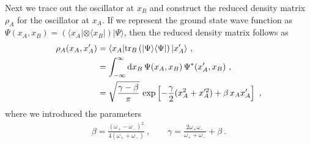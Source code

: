Next we trace out the oscillator at $x_B$ and construct the reduced density matrix $\rho_A$ for the oscillator at $x_A$.
If we represent the ground state wave function as $\Psi (x_A, x_B) = (\langle x_A| \otimes \langle x_B|)| \Psi\rangle$,
then the reduced density matrix follows as
\begin{align}\label{rhoATwoHarm}
\begin{aligned}
\rho_A (x_A, x_A') &=  \langle x_A| {\rm tr}_B \left(|\Psi\rangle \langle \Psi|\right) | x_A'\rangle \ ,\\
&= \int_{-\infty}^\infty \mathrm{d} x_B \, \Psi(x_A, x_B)\,\Psi^\ast (x_A', x_B) \ , \\
&= \sqrt{\frac{\gamma - \beta}{\pi}}\, \exp\left[ -\frac{\gamma}{2}(x_A^2 + x_A'^2) + \beta\, x_A x_A'\right] \ ,
\end{aligned}
\end{align}
where we introduced the parameters 
\begin{align}
\beta = \frac{(\omega_+ - \omega_-)^2}{4(\omega_+ + \omega_-)} \ , \qquad \gamma = \frac{2\omega_+ \omega_-}{\omega_+ + \omega_-} + \beta \ .
\end{align}

